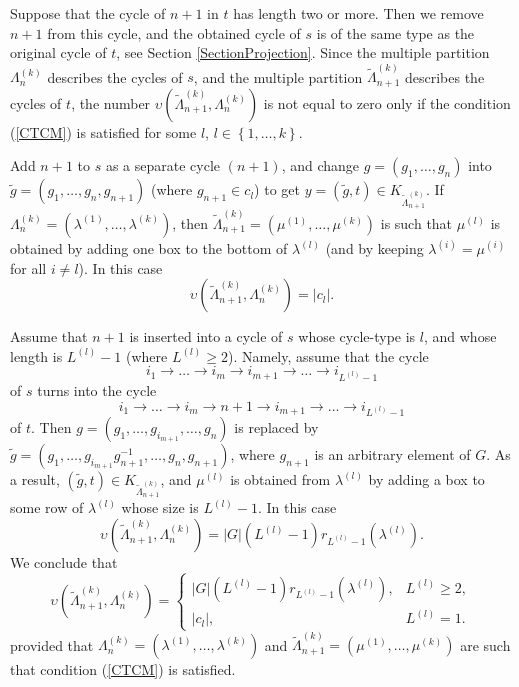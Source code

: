 \documentclass[12pt]{amsart}
\theoremstyle{definition}
\numberwithin{equation}{section}
\newcommand{\tLambda}{\widetilde{\Lambda}}
\begin{document}
Suppose that the cycle of $n+1$ in $t$ has length two or more. Then we remove $n+1$ from this cycle, and the obtained cycle of $s$ is of the same type as the original cycle of $t$, see Section \ref{SectionProjection}. Since the multiple partition $\Lambda_n^{(k)}$ describes the cycles of $s$, and the multiple partition $\tLambda_{n+1}^{(k)}$ describes the cycles of $t$, the number
$\upsilon\left(\tLambda_{n+1}^{(k)},\Lambda_n^{(k)}\right)$ is not equal to zero only if the condition (\ref{CTCM})
is satisfied for some $l$, $l\in\left\{1,\ldots,k\right\}$.


Add $n+1$ to   $s$  as a separate cycle $(n+1)$, and change
$g=\left(g_1,\ldots,g_n\right)$ into $\tilde{g}=\left(g_1,\ldots,g_n,g_{n+1}\right)$ (where
$g_{n+1}\in c_l$) to get $y=\left(\tilde{g},t\right)\in K_{\tLambda_{n+1}^{(k)}}$.
If $\Lambda_n^{(k)}=\left(\lambda^{(1)},\ldots,\lambda^{(k)}\right)$, then $\tLambda_{n+1}^{(k)}=\left(\mu^{(1)},\ldots,\mu^{(k)}\right)$ is such that $\mu^{(l)}$ is obtained
by adding one box to the bottom of $\lambda^{(l)}$ (and by keeping $\lambda^{(i)}=\mu^{(i)}$
for all $i\neq l$). In this case
$$
\upsilon\left(\tLambda_{n+1}^{(k)},\Lambda_n^{(k)}\right)=|c_l|.
$$

Assume that $n+1$ is inserted into a cycle of $s$ whose cycle-type is $l$, and whose length is $L^{(l)}-1$
(where $L^{(l)}\geq 2$). Namely, assume that the cycle
$$
i_1\rightarrow\ldots\rightarrow i_m\rightarrow i_{m+1}\rightarrow\ldots\rightarrow
i_{L^{(l)}-1}
$$
of $s$  turns into the cycle
$$
i_1\rightarrow\ldots\rightarrow i_m\rightarrow n+1\rightarrow i_{m+1}\rightarrow\ldots\rightarrow
i_{L^{(l)}-1}
$$
of $t$. Then $g=\left(g_1,\ldots,g_{i_{m+1}},\ldots,g_n\right)$ is replaced by
$\tilde{g}=\left(g_1,\ldots,g_{i_{m+1}}g^{-1}_{n+1},\ldots,g_n,g_{n+1}\right)$, where
$g_{n+1}$ is an arbitrary element of $G$. As a result, $\left(\tilde{g},t\right)\in K_{\tLambda_{n+1}^{(k)}}$, and $\mu^{(l)}$ is obtained from $\lambda^{(l)}$ by adding
a box to some row of $\lambda^{(l)}$  whose size is $L^{(l)}-1$. In this case
$$
\upsilon\left(\tLambda_{n+1}^{(k)},\Lambda_n^{(k)}\right)=|G|\left(L^{(l)}-1\right)r_{L^{(l)}-1}\left(\lambda^{(l)}\right).
$$
We conclude that
\begin{equation}
\upsilon\left(\tLambda_{n+1}^{(k)},\Lambda_n^{(k)}\right)=
\left\{
  \begin{array}{ll}
    |G|\left(L^{(l)}-1\right)r_{L^{(l)}-1}\left(\lambda^{(l)}\right), & L^{(l)}\geq 2, \\
    |c_l|, & L^{(l)}=1.
  \end{array}
\right.
\end{equation}
provided that  $\Lambda_n^{(k)}=\left(\lambda^{(1)},\ldots,\lambda^{(k)}\right)$ and $\tLambda_{n+1}^{(k)}=\left(\mu^{(1)},\ldots,\mu^{(k)}\right)$ are such that condition
(\ref{CTCM}) is satisfied.
\end{document}
